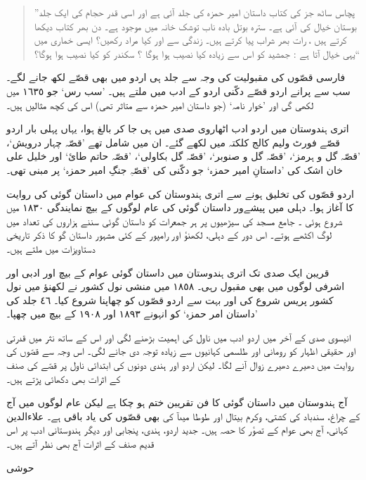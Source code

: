 \documentclass[a4paper]{article}
\newcommand{\deco}{\psvectorian[height=0.75cm]{71}}
\newcommand{\subtitle}[1]{\begingroup\fontsize{24pt}{12pt}\titlefont #1\endgroup\nopagebreak}
\begin{document}
\begin{quote}
”پچاس ساٹھ جز کی کتاب داستان امیر حمزہ کی جلد آئی ہے اور اسی قدر حجام کی ایک جلد بوستان خیال کی آئی ہے۔ سترہ بوتل بادہ ناب توشک خانہ میں موجود ہے۔ دن بھر کتاب دیکھا کرتے ہیں ، رات بھر شراب پیا کرتے ہیں۔ زندگی سے اور کیا مراد رکھیں؟ ایسی خماری میں یہی خیال آتا ہے : جمشید کو اس سے زیادہ کیا نصیب ہوا ہوگا ؟ سکندر کو کیا نصیب ہوا ہوگا؟“
\end{quote}

فارسی قصّوں کی مقبولیت کی وجہ سے جلد ہی اردو میں بھی قصّے لکھ جانے لگے۔ سب سے پرانے اردو قصّے دکّنی اردو کے  ادب میں ملتے ہیں۔ ’سب رس‘ جو ١٦٣٥ میں لکھی گی اور ’خوار نامہ‘ (جو داستان  امیر حمزہ سے متاثر تھی) اس کی کچھ مثالیں ہیں۔

اتری ہندوستان میں اردو ادب اٹھاروی صدی میں ہی جا کر بالغ ہوا، یہاں پہلی بار اردو قصّے فورٹ ولیم کالج کلکتہ میں لکھے گئے۔ ان میں شامل تھے ’قصّہ چہار درویش‘، ’قصّہ گل و ہرمز‘، ’قصّہ گل و صنوبر‘، ’قصّہ گل بکاولی‘، ’قصّہ حاتم طائ‘ اور خلیل علی خان اشک کی ’داستانِ امیر حمزہ‘ جو دکّنی کی ’قصّہِ جنگِ امیر حمزہ‘ پر مبنی تھی۔

اردو قصّوں کی تخلیق ہونے سے اتری ہندوستان کی عوام میں داستان گوئی کی روایت کا آغاز ہوا۔ دہلی  میں  پیشےور داستان گوئی کی عام لوگوں کے بیچ نمایندگی ١٨٣٠ میں شروع ہوئی ۔ جامع مسجد کی سیڑھیوں پر ہر  جمعرات کو داستان گوئی سننے ہزاروں کی تعداد میں لوگ اکٹھے ہوتے۔ اس دور کے  دہلی، لکھنؤ اور رامپور کے کئی  مشہور داستان گو کا ذکر تاریخی دستاویزات میں  ملتے ہیں۔

قریبن ایک صدی تک اتری ہندوستان میں داستان گوئی عوام کے بیچ اور ادبی اور اشرفی لوگوں میں بھی مقبول رہی۔ ١٨٥٨ میں منشی نول کشور نے لکھنؤ میں نول کشور پریس شروع کی اور بہت سے اردو قصّوں کو چھاپنا شروع کیا۔ ٤٦ جلد کی ’داستان امر حمزہ‘ کو انہونے ١٨٩٣ اور ١٩٠٨ کے بیچ میں چھپا۔

انیسوی صدی کے آخر میں اردو ادب میں ناول کی اہمیت بڑھنے لگی اور اس کے ساتھ نثر میں قدرتی اور حقیقی اظہار کو رومانی اور طلسمی کہانیوں سے زیادہ توجہ دی جانے لگی۔ اس وجہ سے قصّوں کی روایت میں دھیرے  دھیرے زوال آنے لگا۔ لیکن اردو اور ہندی دونوں کی ابتدائی ناول پر قصّے کی صنف کے اثرات بھی دکھائی پڑتے ہیں۔

 آج ہندوستان میں داستان گوئی کا فن تقریبن ختم ہو چکا ہے لیکن عام لوگوں میں آج بھی قصّوں کی یاد باقی ہے۔ علاءالدين‎ کے چراغ، سندباد کی کشتی، وکرم بیتال اور طوطا میںآ کی کہانی، آج بھی عوام کے تصؤر کا حصہ  ہیں۔ جدید اردو، ہندی، پنجابی اور دیگر ہندوستانی ادب پر اس قدیم صنف کے اثرات آج بھی نظر آتے ہیں۔

\begin{center}
\deco

\subtitle{حوشی}
\end{center}
\end{document}
